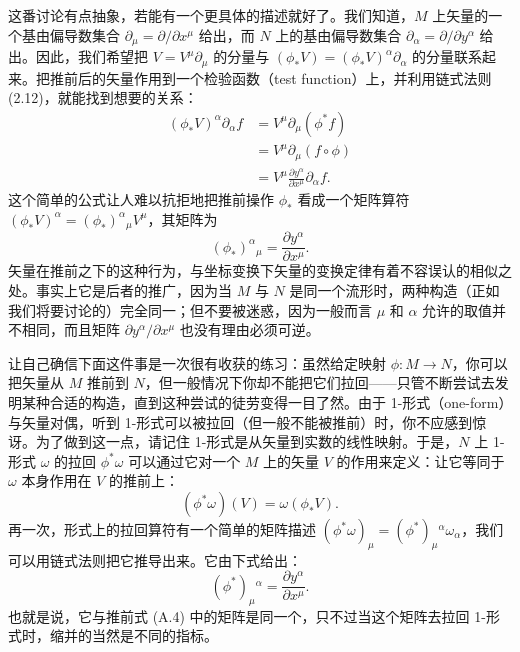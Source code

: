 这番讨论有点抽象，若能有一个更具体的描述就好了。我们知道，$M$ 上矢量的一个基由偏导数集合 $\partial_{\mu} = \partial/\partial x^{\mu}$ 给出，而 $N$ 上的基由偏导数集合 $\partial_{\alpha} = \partial/\partial y^{\alpha}$ 给出。因此，我们希望把 $V = V^{\mu}\partial_{\mu}$ 的分量与 $(\phi_{*}V) = (\phi_{*}V)^{\alpha}\partial_{\alpha}$ 的分量联系起来。把推前后的矢量作用到一个检验函数（test function）上，并利用链式法则 (2.12)，就能找到想要的关系：
\begin{align*}
(\phi_{*}V)^{\alpha}\partial_{\alpha}f &= V^{\mu}\partial_{\mu}(\phi^{*}f)\\
 &= V^{\mu}\partial_{\mu}(f\circ\phi)\\
 &= V^{\mu}\frac{\partial y^{\alpha}}{\partial x^{\mu}}\partial_{\alpha}f.
\tag{A.3}
\end{align*}
这个简单的公式让人难以抗拒地把推前操作 $\phi_{*}$ 看成一个矩阵算符 $(\phi_{*}V)^{\alpha} = (\phi_{*})^{\alpha}{}_{\mu}V^{\mu}$，其矩阵为
\begin{equation*}
(\phi_{*})^{\alpha}{}_{\mu} = \frac{\partial y^{\alpha}}{\partial x^{\mu}}.
\tag{A.4}
\end{equation*}
矢量在推前之下的这种行为，与坐标变换下矢量的变换定律有着不容误认的相似之处。事实上它是后者的推广，因为当 $M$ 与 $N$ 是同一个流形时，两种构造（正如我们将要讨论的）完全同一；但不要被迷惑，因为一般而言 $\mu$ 和 $\alpha$ 允许的取值并不相同，而且矩阵 $\partial y^{\alpha}/\partial x^{\mu}$ 也没有理由必须可逆。

让自己确信下面这件事是一次很有收获的练习：虽然给定映射 $\phi : M \to N$，你可以把矢量从 $M$ 推前到 $N$，但一般情况下你却不能把它们拉回——只管不断尝试去发明某种合适的构造，直到这种尝试的徒劳变得一目了然。由于 1-形式（one-form）与矢量对偶，听到 1-形式可以被拉回（但一般不能被推前）时，你不应感到惊讶。为了做到这一点，请记住 1-形式是从矢量到实数的线性映射。于是，$N$ 上 1-形式 $\omega$ 的拉回 $\phi^{*}\omega$ 可以通过它对一个 $M$ 上的矢量 $V$ 的作用来定义：让它等同于 $\omega$ 本身作用在 $V$ 的推前上：
\begin{equation*}
(\phi^{*}\omega)(V) = \omega(\phi_{*}V).
\tag{A.5}
\end{equation*}
再一次，形式上的拉回算符有一个简单的矩阵描述 $(\phi^{*}\omega)_{\mu} = (\phi^{*})_{\mu}{}^{\alpha}\omega_{\alpha}$，我们可以用链式法则把它推导出来。它由下式给出：
\begin{equation*}
(\phi^{*})_{\mu}{}^{\alpha} = \frac{\partial y^{\alpha}}{\partial x^{\mu}}.
\tag{A.6}
\end{equation*}
也就是说，它与推前式 (A.4) 中的矩阵是同一个，只不过当这个矩阵去拉回 1-形式时，缩并的当然是不同的指标。

